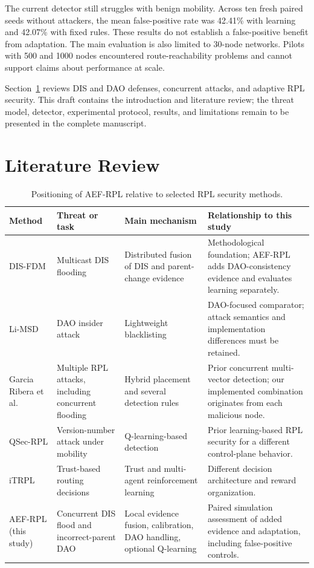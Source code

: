 \documentclass[journal]{IEEEtran}
\begin{document}
The current detector still struggles with benign mobility. Across ten fresh paired seeds without attackers, the mean false-positive rate was 42.41\% with learning and 42.07\% with fixed rules. These results do not establish a false-positive benefit from adaptation. The main evaluation is also limited to 30-node networks. Pilots with 500 and 1000 nodes encountered route-reachability problems and cannot support claims about performance at scale.

Section~\ref{sec:related} reviews DIS and DAO defenses, concurrent attacks, and adaptive RPL security. This draft contains the introduction and literature review; the threat model, detector, experimental protocol, results, and limitations remain to be presented in the complete manuscript.

\section{Literature Review}\label{sec:related}
\begin{table}[t]
\caption{Positioning of AEF-RPL relative to selected RPL security methods.}
\label{tab:positioning}
\centering
\footnotesize
\setlength{\tabcolsep}{5pt}
\renewcommand{\arraystretch}{1.16}
\begin{tabularx}{\textwidth}{@{}p{}p{}p{}X@{}}
\toprule
Method & Threat or task & Main mechanism & Relationship to this study \\
\midrule
DIS-FDM \cite{prajisha2025} & Multicast DIS flooding & Distributed fusion of DIS and parent-change evidence & Methodological foundation; AEF-RPL adds DAO-consistency evidence and evaluates learning separately. \\
Li-MSD \cite{limsd2024} & DAO insider attack & Lightweight blacklisting & DAO-focused comparator; attack semantics and implementation differences must be retained. \\
Garcia Ribera et al.\ \cite{garciaribera2022} & Multiple RPL attacks, including concurrent flooding & Hybrid placement and several detection rules & Prior concurrent multi-vector detection; our implemented combination originates from each malicious node. \\
QSec-RPL \cite{qsecrpl2023} & Version-number attack under mobility & Q-learning-based detection & Prior learning-based RPL security for a different control-plane behavior. \\
iTRPL \cite{itrpl2024} & Trust-based routing decisions & Trust and multi-agent reinforcement learning & Different decision architecture and reward organization. \\
AEF-RPL (this study) & Concurrent DIS flood and incorrect-parent DAO & Local evidence fusion, calibration, DAO handling, optional Q-learning & Paired simulation assessment of added evidence and adaptation, including false-positive controls. \\
\bottomrule
\end{tabularx}
\end{table}
\end{document}
